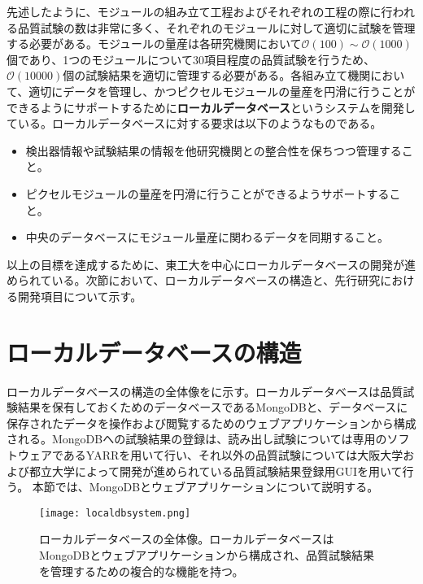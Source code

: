 先述したように、モジュールの組み立て工程およびそれぞれの工程の際に行われる品質試験の数は非常に多く、それぞれのモジュールに対して適切に試験を管理する必要がある。モジュールの量産は各研究機関において$\mathcal{O}(100)\sim \mathcal{O}(1000)$個であり、1つのモジュールについて$30$項目程度の品質試験を行うため、$\mathcal{O}(10000)$個の試験結果を適切に管理する必要がある。各組み立て機関において、適切にデータを管理し、かつピクセルモジュールの量産を円滑に行うことができるようにサポートするために\textbf{ローカルデータベース}というシステムを開発している。ローカルデータベースに対する要求は以下のようなものである。
\begin{itemize}
  \item 検出器情報や試験結果の情報を他研究機関との整合性を保ちつつ管理すること。
  \item ピクセルモジュールの量産を円滑に行うことができるようサポートすること。
  \item 中央のデータベースにモジュール量産に関わるデータを同期すること。
\end{itemize}

以上の目標を達成するために、東工大を中心にローカルデータベースの開発が進められている。次節において、ローカルデータベースの構造と、先行研究における開発項目について示す。

\section{ローカルデータベースの構造}
\label{sec:AboutLocalDB}
ローカルデータベースの構造の全体像をに示す。ローカルデータベースは品質試験結果を保有しておくためのデータベースであるMongoDBと、データベースに保存されたデータを操作および閲覧するためのウェブアプリケーションから構成される。MongoDBへの試験結果の登録は、読み出し試験については専用のソフトウェアであるYARRを用いて行い、それ以外の品質試験については大阪大学および都立大学によって開発が進められている品質試験結果登録用GUIを用いて行う。
本節では、MongoDBとウェブアプリケーションについて説明する。


\begin{figure}[tbp]
  \centering
  \texttt{[image: localdbsystem.png]}
  \caption[ローカルデータベースの全体像]{ローカルデータベースの全体像。ローカルデータベースはMongoDBとウェブアプリケーションから構成され、品質試験結果を管理するための複合的な機能を持つ。}
  \label{fig:localdbsystem}
\end{figure}

